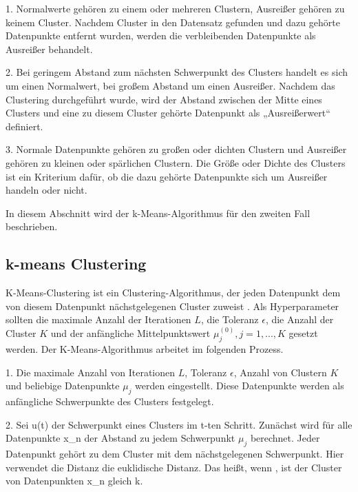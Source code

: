                 1. Normalwerte gehören zu einem oder mehreren Clustern, Ausreißer gehören zu keinem Cluster.
                    Nachdem Cluster in den Datensatz gefunden und dazu gehörte Datenpunkte entfernt wurden, werden die verbleibenden Datenpunkte als Ausreißer behandelt.

                2. Bei geringem Abstand zum nächsten Schwerpunkt des Clusters handelt es sich um einen Normalwert, bei großem Abstand um einen Ausreißer.
                    Nachdem das Clustering durchgeführt wurde, wird der Abstand zwischen der Mitte eines Clusters und eine zu diesem Cluster gehörte Datenpunkt als „Ausreißerwert“ definiert.

                3. Normale Datenpunkte gehören zu großen oder dichten Clustern und Ausreißer gehören zu kleinen oder spärlichen Clustern.
                    Die Größe oder Dichte des Clusters ist ein Kriterium dafür, ob die dazu gehörte Datenpunkte sich um Ausreißer handeln oder nicht.

            In diesem Abschnitt wird der k-Means-Algorithmus für den zweiten Fall beschrieben.
            
            \subsection{k-means Clustering}
                K-Means-Clustering ist ein Clustering-Algorithmus, der jeden Datenpunkt dem von diesem Datenpunkt nächstgelegenen Cluster zuweist \cite{Lloyd82}. Als Hyperparameter sollten die maximale Anzahl der Iterationen $L$, die Toleranz $\epsilon$, die Anzahl der Cluster $K$ und der anfängliche Mittelpunktswert $\mu^{(0)}_j, j=1,...,K$ gesetzt werden. Der K-Means-Algorithmus arbeitet im folgenden Prozess.
                
                    1. Die maximale Anzahl von Iterationen $L$, Toleranz $\epsilon$, Anzahl von Clustern $K$ und beliebige Datenpunkte $\mu_j$ werden eingestellt. Diese Datenpunkte werden als anfängliche Schwerpunkte des Clusters festgelegt.
                    
                    2. Sei u(t) der Schwerpunkt eines Clusters im t-ten Schritt. Zunächst wird für alle Datenpunkte x_n der Abstand zu jedem Schwerpunkt $\mu_j$ berechnet. Jeder Datenpunkt gehört zu dem Cluster mit dem nächstgelegenen Schwerpunkt. Hier verwendet die Distanz die euklidische Distanz. Das heißt, wenn
                    ,
                    ist der Cluster von Datenpunkten x_n gleich k.

